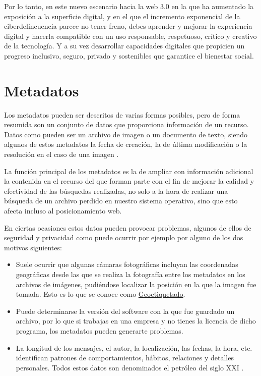 \documentclass[
  a4paper,
  openany]{book}
\begin{document}
Por lo tanto, en este nuevo escenario hacia la web 3.0 en la que ha aumentado la exposición a la superficie digital, y en el que el incremento exponencial de la ciberdelincuencia parece no tener freno, debes aprender y mejorar la experiencia digital y hacerla compatible con un uso responsable, respetuoso, crítico y creativo de la tecnología. Y a su vez desarrollar capacidades digitales que propicien un progreso inclusivo, seguro, privado y sostenibles que garantice el bienestar social.

\hypertarget{metadatos}{%
\section{Metadatos}\label{metadatos}}

Los metadatos pueden ser descritos de varias formas posibles, pero de forma resumida son un conjunto de datos que proporciona información de un recurso. Datos como pueden ser un archivo de imagen o un documento de texto, siendo algunos de estos metadatos la fecha de creación, la de última modificación o la resolución en el caso de una imagen \citep{WIKI-meta}.

La función principal de los metadatos es la de ampliar con información adicional la contenida en el recurso del que forman parte con el fin de mejorar la calidad y efectividad de las búsquedas realizadas, no solo a la hora de realizar una búsqueda de un archivo perdido en nuestro sistema operativo, sino que esto afecta incluso al posicionamiento web.

En ciertas ocasiones estos datos pueden provocar problemas, algunos de ellos de seguridad y privacidad como puede ocurrir por ejemplo por alguno de los dos motivos siguientes:

\begin{itemize}
\item
  Suele ocurrir que algunas cámaras fotográficas incluyan las coordenadas geográficas desde las que se realiza la fotografía entre los metadatos en los archivos de imágenes, pudiéndose localizar la posición en la que la imagen fue tomada. Esto es lo que se conoce como \href{https://es.wikipedia.org/wiki/Geoetiquetado}{Geoetiquetado}.
\item
  Puede determinarse la versión del software con la que fue guardado un archivo, por lo que si trabajas en una empresa y no tienes la licencia de dicho programa, los metadatos pueden generarte problemas.
\item
  La longitud de los mensajes, el autor, la localización, las fechas, la hora, etc. identifican patrones de comportamientos, hábitos, relaciones y detalles personales. Todos estos datos son denominados el petróleo del siglo XXI \citep{OSI-petroleo-S-XXI}.
\end{itemize}
\end{document}
